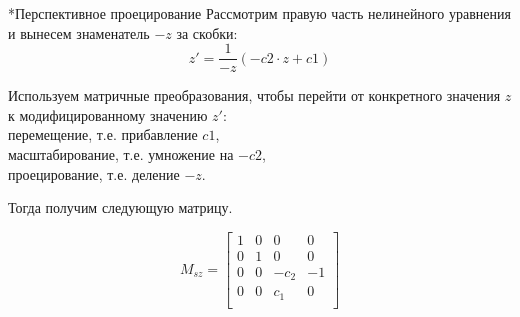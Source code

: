 \documentclass{beamer}
\begin{document}
	\begin{frame}{*Перспективное проецирование}
	Рассмотрим правую часть нелинейного уравнения и вынесем знаменатель $-z$ за скобки:
		\[
		z' =  \frac{1}{-z} (-c2 \cdot z + c1)
	\]

	Используем матричные преобразования, чтобы перейти от конкретного значения $z$ к модифицированному значению $z'$:\\ 
	перемещение, т.е. прибавление $c1$, \\
	масштабирование, т.е. умножение на $-c2$, \\
	проецирование, т.е. деление $-z$.

	Тогда получим следующую матрицу.


	\[
		M_{sz} = 
	\begin{bmatrix}
		1 & 0 & 0 & 0 \\
		0 & 1 & 0 & 0 \\
		0 & 0 & -c_2 & -1 \\
		0 & 0 & c_1 & 0 \\
	\end{bmatrix}	
	\]

	\note{

	\[
		\begin{bmatrix}
			p_x \\
			p_y \\
			p_z \\
			1		\\
		\end{bmatrix}^T
		\begin{bmatrix}
			1 & 0 & 0 & 0 \\
			0 & 1 & 0 & 0 \\
			0 & 0 & -c_2 & -1 \\
			0 & 0 & c_1 & 0 \\
		\end{bmatrix}
		=
		\begin{bmatrix}
			p_x \\
			p_y \\
			-c_2 p_z + c_1 \\
			-z	\\
		\end{bmatrix}^T
		\]
		\[
			\begin{bmatrix}
				p_x^{*} \\
				p_y^{*} \\
				p_z^{*} \\
				1		\\
			\end{bmatrix}^T
			=
			\begin{bmatrix}
			 p_x / (-z) \\
				p_y / (-z) \\
				(-c_2 p_z + c_1) / (-z) \\
				1	\\
			\end{bmatrix}^T
		\]
	}

\end{frame}
\end{document}
